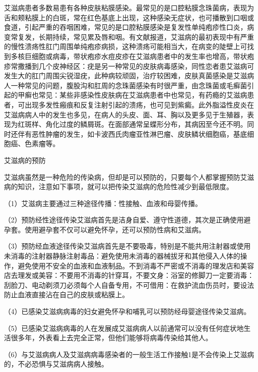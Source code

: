 \documentclass[12pt,UTF8,openany]{ctexbook}
\begin{document}
艾滋病患者多数易患有各种皮肤粘膜感染。最常见的是口腔粘膜念珠菌病，表现为舌和颊粘膜上的白斑，常在红色基底上出现，这种感染无症状，也可播散到口咽或食道，引起严重的吞咽困难，常见的是口腔粘膜感染是复发性单纯疱疹性口炎，病变常复发，长期持续，常见累及唇和咽。有文献报道，艾滋病的最初表现中有严重的慢性溃疡性肛门周围单纯疱疹病损，这种溃疡可能相当大，在病变的陡壁上可找到多核巨细胞或病毒，带状疱疹水痘皮疹在艾滋病患者中的发生率也增高，带状疱疹常撒播到几个皮神经区：疣是另一种常见的皮肤病毒感染，同性恋者患艾滋病可发生大的肛门周围尖锐湿疣，此种病较顽固，治疗较困难，皮肤真菌感染是艾滋病人一种常见的问题，腹股沟和肛周的念珠菌感染有时很严重，由念珠菌或毛癣菌引起的甲癣也常见：某些非感染性皮肤病在艾滋病患者中也常见，有药瘾的艾滋病患者，可出现多发性瘢痕和反复注射引起的溃疡，也可见到紫癜。此外脂溢性皮炎在艾滋病病人中的发生也多见，在病人的头皮、面、耳、胸以及更多见于生殖器，表现为红斑样、角化过度的鳞屑斑。在面部通常呈蝶形分布，其病因至今还不明。同时还伴有恶性肿瘤的发生，如卡波西氏肉瘤亚性淋巴瘤、皮肤鳞状细胞癌，基底细胞癌、色素瘤等。





艾滋病的预防


艾滋病虽然是一种危险的传染病，但却是可以预防的，只要每个人都掌握预防艾滋病的知识，注意如下事项，就可以把传染艾滋病的危险性减少到最低限度。

（1）艾滋病主要通过三种途径传播：性接触、血液和母婴传播。

（2）预防经性途径传染艾滋病首先是洁身自爱、遵守性道德，其次是正确使用避孕套。使用避孕套不仅可以避免怀孕，还可以预防性病和艾滋病。

（3）预防经血液途径传染艾滋病首先是不要吸毒，特别是不能共用注射器或使用未消毒的注射器静脉注射毒品：避免使用未消毒的器械拔牙和其他侵入人体的操作，避免使用不安全的血液和血液制品。不到消毒不严密或不消毒的理发店和美容店去理发或美容：不要用不消毒的针穿耳，不要文身：浴室的修脚刀一定要消毒：刮脸刀、电动剃须刀必须每个人自备专用，不可借用：在救护流血伤员时，要设法防止血液直接沾在自己的皮肤或粘膜上。

（4）已感染艾滋病病毒的妇女避免怀孕和哺乳可以预防经母婴途径传染艾滋病。

（5）已感染艾滋病病毒的人在发展成艾滋病病人以前通常可以没有任何症状地生活很多年，外表看上去完全正常，但他们能够将病毒传染给其他人。

（6）与艾滋病病人及艾滋病病毒感染者的一般生活工作接触1是不会传染上艾滋病的，不必恐惧与艾滋病病人接触。
\end{document}
